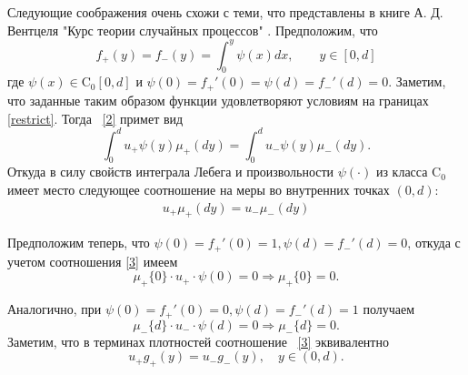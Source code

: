 \documentclass[12pt,a4paper]{article}
\begin{document}
Следующие соображения очень схожи с теми, что представлены в книге А. Д. Вентцеля "Курс теории случайных процессов" \cite{Venz}.
Предположим, что 
$$f_+ (y) = f_- (y) = \displaystyle\int_0^y \psi (x) dx, \qquad y \in [0, d]$$
где $\psi (x) \in \mathrm{C}_{0} [0, d]$ и $\psi (0) = f_+' (0) =  \psi (d) = f_-' (d) = 0$. Заметим, что заданные таким образом функции удовлетворяют условиям на границах \eqref{restrict}. Тогда ~\eqref{2} примет вид
$$ \int_0^d u_+ \psi (y) \mu_+ (dy) = \int_0^d u_- \psi (y) \mu_- (dy).$$
Откуда в силу свойств интеграла Лебега и произвольности $\psi (\cdot)$ из класса $\mathrm{C}_0$ имеет место следующее соотношение на меры во внутренних точках $(0, d)$:
\begin{align}\label{3}
u_+ \mu_+ (dy) = u_- \mu_- (dy)
\end{align}

Предположим теперь, что $\psi (0) = f_+' (0) = 1, \psi (d) = f_-' (d) = 0$, откуда с учетом соотношения \eqref{3} имеем
$$\mu_+ \{0\} \cdot u_+ \cdot \psi (0) = 0 \Rightarrow \mu_+ \{0\} = 0.$$

Аналогично, при  $\psi (0) = f_+' (0) = 0, \psi (d) = f_-' (d) = 1$ получаем
$$\mu_- \{d\} \cdot u_- \cdot \psi (d) = 0 \Rightarrow \mu_- \{d\} = 0.$$
Заметим, что в терминах плотностей соотношение ~\eqref{3} эквивалентно
\begin{equation}\label{density_eq}
    u_+ g_+(y) = u_- g_- (y), \quad y \in (0, d).
\end{equation}
\end{document}
